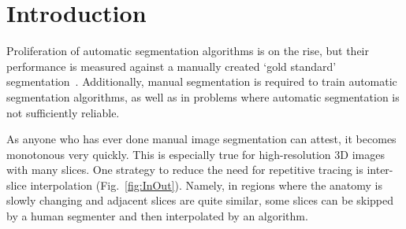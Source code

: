 \documentclass{InsightArticle}
\newcommand{\IJhandlerIDnumber}{1338}
\begin{document}
\IJhandlenote{\IJhandlerIDnumber}

\newpage

\tableofcontents


\section{Introduction}

Proliferation of automatic segmentation algorithms is on the rise,
but their performance is measured against a manually created `gold standard' segmentation~\cite{py06nimg}.
Additionally, manual segmentation is required to train automatic segmentation algorithms,
as well as in problems where automatic segmentation is not sufficiently reliable.

As anyone who has ever done manual image segmentation can attest,
it becomes monotonous very quickly.
This is especially true for high-resolution 3D images with many slices.
One strategy to reduce the need for repetitive tracing is inter-slice interpolation (Fig.~\ref{fig:InOut}).
Namely, in regions where the anatomy is slowly changing and adjacent slices are quite similar,
some slices can be skipped by a human segmenter and then interpolated by an algorithm.
\end{document}
